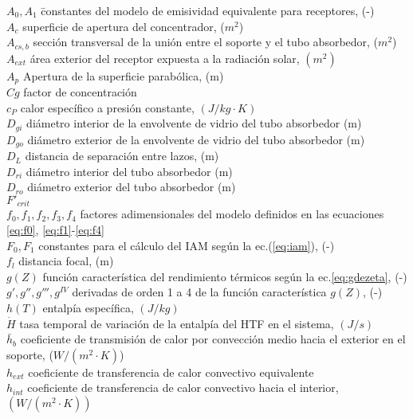 \begin{tabbing}
$A_0, A_1$ \quad\quad\quad\quad\quad\quad\= constantes del modelo de emisividad equivalente para receptores, (-) \\
$A_{c}$ \> superficie de apertura del concentrador, ($m^2$) \\
$A_{cs,b}$ \> sección transversal de la unión entre el soporte y el tubo absorbedor, ($m^2$) \\
$A_{ext}$ \>  área exterior del receptor expuesta a la radiación solar, $(m^2)$ \\
$A_{p}$ \> Apertura de la superficie parabólica, (m) \\
$Cg$  \>   factor de concentración \\
$c_P$ \> calor específico a presión constante, $(J/kg\cdot K)$ \\
$D_{gi}$  \>  diámetro interior de la envolvente de vidrio del tubo absorbedor (m) \\
$D_{go}$ \> diámetro exterior de la envolvente de vidrio del tubo absorbedor (m)   \\
$D_L$ \> distancia de separación entre lazos, (m) \\
$D_{ri}$  \>  diámetro interior del tubo absorbedor (m) \\
$D_{ro}$ \> diámetro exterior del tubo absorbedor (m)   \\
$F'_{crit}$ \> \\
$f_0, f_1, f_2, f_3, f_4$ \> factores adimensionales del modelo definidos en las ecuaciones \eqref{eq:f0}, \eqref{eq:f1}-\eqref{eq:f4} \\
$F_0, F_1$ \> constantes para el cálculo del IAM según la ec.(\eqref{eq:iam}), (-) \\
$f_l$ \> distancia focal, (m) \\
$g(Z)$ \> función característica del rendimiento térmicos según la ec.\eqref{eq:gdezeta}, (-) \\
$g', g'', g''', g^{IV}$ \> derivadas de orden 1 a 4 de la función característica $g(Z)$, (-) \\
$h(T)$ \> entalpía específica, $(J/kg)$ \\
$\dot H$ \> tasa temporal de variación de la entalpía del HTF en el sistema, $(J/s)$ \\
$\bar h_b$ \>coeficiente de transmisión de calor por convección medio hacia el exterior en el soporte, ($W/(m^2 \cdot K)$) \\
$h_{ext}$ \> coeficiente de transferencia de calor convectivo equivalente \\
$h_{int}$ \> coeficiente de transferencia de calor convectivo hacia el interior, $(W/(m^{2}\cdot K))$ \\

\end{tabbing}

